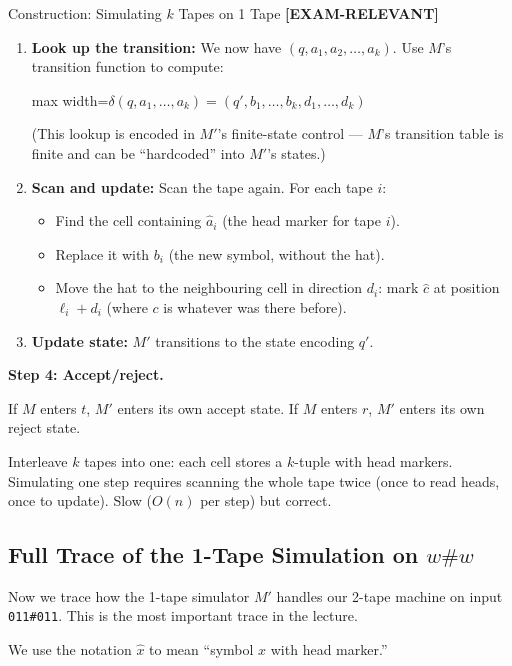 \documentclass[11pt,a4paper]{article}
\newcommand{\fitmath}[1]{\begin{adjustbox}{max width=\linewidth}$\displaystyle #1$\end{adjustbox}}
\newcommand{\kemark}{\textcolor{red!70!black}{\textbf{[EXAM-RELEVANT]}}}
\newcommand{\kt}[1]{\par\vspace{0.3em}\colorbox{yellow!60}{\parbox{\dimexpr\linewidth-2\fboxsep}{#1}}\vspace{0.3em}}
\begin{document}
\begin{definitionbox}{Construction: Simulating $k$ Tapes on 1 Tape \kemark}
\begin{enumerate}
\item \textbf{Look up the transition:} We now have $(q, a_1, a_2, \ldots, a_k)$. Use $M$'s transition function to compute:
\fitmath{\delta(q, a_1, \ldots, a_k) = (q', b_1, \ldots, b_k, d_1, \ldots, d_k)}

(This lookup is encoded in $M'$'s finite-state control --- $M$'s transition table is finite and can be ``hardcoded'' into $M'$'s states.)

\item \textbf{Scan and update:} Scan the tape again. For each tape $i$:
\begin{itemize}[nosep]
\item Find the cell containing $\hat{a}_i$ (the head marker for tape $i$).
\item Replace it with $b_i$ (the new symbol, without the hat).
\item Move the hat to the neighbouring cell in direction $d_i$: mark $\hat{c}$ at position $\ell_i + d_i$ (where $c$ is whatever was there before).
\end{itemize}

\item \textbf{Update state:} $M'$ transitions to the state encoding $q'$.
\end{enumerate}

\textbf{Step 4: Accept/reject.}

If $M$ enters $t$, $M'$ enters its own accept state. If $M$ enters $r$, $M'$ enters its own reject state.

\kt{Interleave $k$ tapes into one: each cell stores a $k$-tuple with head markers. Simulating one step requires scanning the whole tape twice (once to read heads, once to update). Slow ($O(n)$ per step) but correct.}
\end{definitionbox}

\subsection{Full Trace of the 1-Tape Simulation on $w\#w$}

Now we trace how the 1-tape simulator $M'$ handles our 2-tape machine on input \texttt{011\#011}. This is the most important trace in the lecture.

We use the notation $\hat{x}$ to mean ``symbol $x$ with head marker.''
\end{document}

